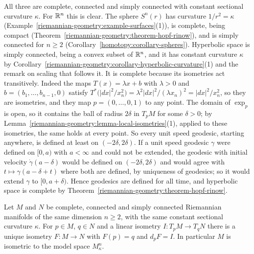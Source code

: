 All three are complete, connected and simply connected with constant sectional curvature $\kappa$. For $\mathbb{R}^n$ this is clear. The sphere $S^n(r)$ has curvature
$1/r^2 = \kappa$ (Example~\ref{riemannian-geometry:example-surfaces}(1)), is complete, being compact (Theorem~\ref{riemannian-geometry:theorem-hopf-rinow}), and is simply
connected for $n \geq 2$ (Corollary~\ref{homotopy:corollary-spheres}). Hyperbolic space is simply connected, being a convex subset of $\mathbb{R}^n$, and it has constant curvature $\kappa$ by
Corollary~\ref{riemannian-geometry:corollary-hyperbolic-curvature}(1) and the remark on scaling that follows it. It is complete because its isometries act transitively. Indeed the maps
$T(x) = \lambda x + b$ with $\lambda > 0$ and $b = (b_1, \ldots, b_{n-1}, 0)$ satisfy $T^*\bigl(|dx|^2/x_n^2\bigr) = \lambda^2|dx|^2/(\lambda x_n)^2 = |dx|^2/x_n^2$, so they are isometries, and they map
$p = (0, \ldots, 0, 1)$ to any point. The domain of $\exp_p$ is open, so it contains the ball of radius $2\delta$ in $T_pM$ for some $\delta > 0$; by
Lemma~\ref{riemannian-geometry:lemma-local-isometries}(1), applied to these isometries, the same holds at every point. So every unit speed geodesic, starting anywhere, is defined at least on
$(-2\delta, 2\delta)$. If a unit speed geodesic $\gamma$ were defined on $[0, a)$ with $a < \infty$ and could not be extended, the geodesic with initial velocity $\dot\gamma(a - \delta)$ would be
defined on $(-2\delta, 2\delta)$ and would agree with $t \mapsto \gamma(a - \delta + t)$ where both are defined, by uniqueness of geodesics; so it would extend $\gamma$ to $[0, a + \delta)$. Hence
geodesics are defined for all time, and hyperbolic space is complete by Theorem~\ref{riemannian-geometry:theorem-hopf-rinow}.

\begin{theorem}\label{riemannian-geometry:theorem-killing-hopf}
Let $M$ and $N$ be complete, connected and simply connected Riemannian manifolds of the same dimension $n \geq 2$, with the same constant sectional curvature
$\kappa$. For $p \in M$, $q \in N$ and a linear isometry $I \colon T_pM \to T_qN$ there is a unique isometry $F \colon M \to N$ with $F(p) = q$ and $d_pF = I$.
In particular $M$ is isometric to the model space $M^n_\kappa$.
\end{theorem}

